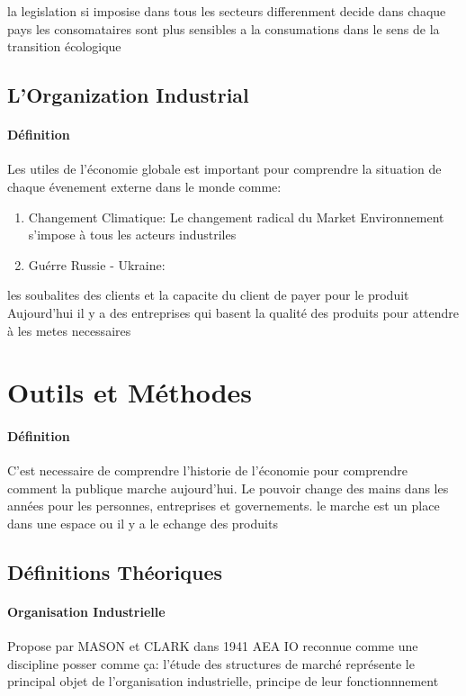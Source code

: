 \documentclass{article}
\begin{document}
la legislation si imposise dans tous les secteurs differenment decide dans chaque pays
les consomataires sont plus sensibles a la consumations dans le sens de la transition écologique

\subsection{L'Organization Industrial}
\paragraph{Définition}Les utiles de l'économie globale est important pour comprendre la situation de chaque évenement externe dans le monde comme:
\begin{enumerate}
    \item Changement Climatique: Le changement radical du Market Environnement s'impose à tous les acteurs industriles
    \item Guérre Russie - Ukraine:
\end{enumerate}

les soubalites des clients et la capacite du client de payer pour le produit
Aujourd'hui il y a des entreprises qui basent la qualité des produits pour attendre à les metes necessaires


\newpage\section{Outils et Méthodes}
\paragraph{Définition}C'est necessaire de comprendre l'historie de l'économie pour comprendre comment la publique marche aujourd'hui. Le pouvoir change des mains dans les années pour les personnes, entreprises et governements.
le marche est un place dans une espace ou il y a le echange des produits

\subsection{Définitions Théoriques}
\paragraph{Organisation Industrielle}Propose par MASON et CLARK dans 1941 AEA IO reconnue comme une discipline posser comme ça: l'étude des structures de marché représente le principal objet de l'organisation industrielle, principe de leur fonctionnnement
\end{document}
